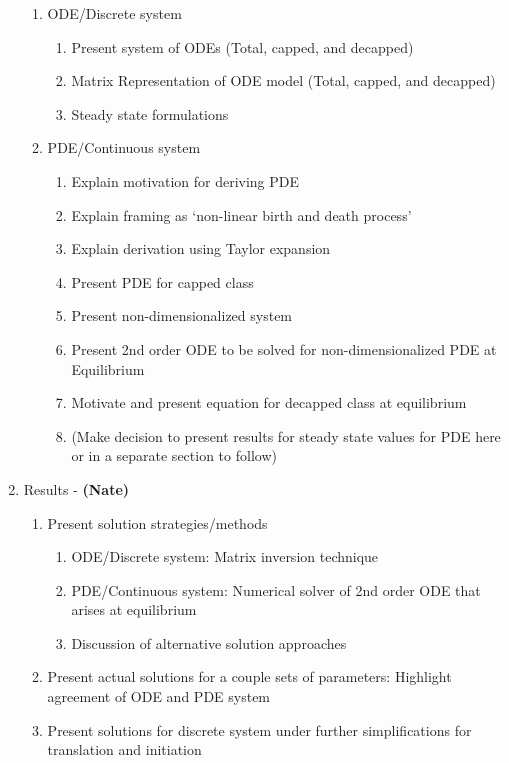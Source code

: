 \documentclass[review]{elsarticle}
\begin{document}
\begin{enumerate}
\begin{enumerate}
\item ODE/Discrete system
\begin{enumerate}
\item Present system of ODEs (Total, capped, and decapped)
\item Matrix Representation of ODE model (Total, capped, and decapped)
\item Steady state formulations
\end{enumerate}
\item PDE/Continuous system 
\begin{enumerate}
\item Explain motivation for deriving PDE
\item Explain framing as `non-linear birth and death process'
\item Explain derivation using Taylor expansion
\item Present PDE for capped class
\item Present non-dimensionalized system
\item Present 2nd order ODE to be solved for non-dimensionalized PDE at Equilibrium
\item Motivate and present equation for decapped class at equilibrium
\item (Make decision to present results for steady state values for PDE here or in a separate section to follow)
\end{enumerate}
\end{enumerate}
\item Results  - \textbf{(Nate)}
\begin{enumerate}
\item Present solution strategies/methods
\begin{enumerate}
\item ODE/Discrete system: Matrix inversion technique
\item PDE/Continuous system: Numerical solver of 2nd order ODE that arises at equilibrium
\item Discussion of alternative solution approaches
\end{enumerate}
\item Present actual solutions for a couple sets of parameters: Highlight agreement of ODE and PDE system
\item Present solutions for discrete system under further simplifications for translation and initiation

\end{enumerate}
\end{enumerate}
\end{document}
